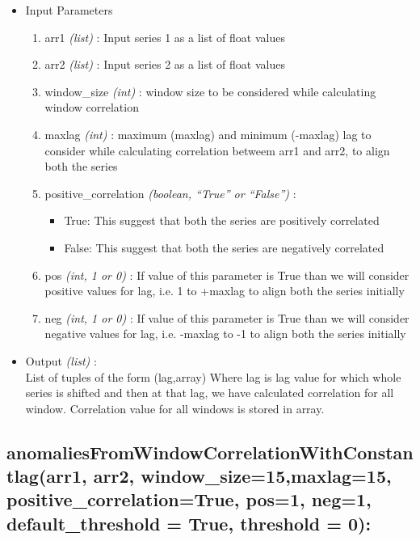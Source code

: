 \begin{itemize}
 \item Input Parameters
 
 \begin{enumerate}
  \item arr1 \textit{(list)} : Input series 1 as a list of float values
  \item arr2 \textit{(list)} : Input series 2 as a list of float values
  \item window\_size \textit{(int)} : window size to be considered while 
calculating window correlation
  \item maxlag \textit{(int)} : maximum (maxlag) and minimum (-maxlag) lag to 
consider while calculating correlation betweem arr1 and arr2, to align both the 
series
  \item positive\_correlation \textit{(boolean, ``True'' or ``False'')} : 
      \begin{itemize}
       \item True: This suggest that both the series are positively correlated
       \item False: This suggest that both the series are negatively correlated
      \end{itemize}
      
  \item pos \textit{(int, 1 or 0)} : If value of this parameter is True than we 
will consider positive values for lag, i.e. 1 to +maxlag to align both the 
series initially
  \item neg \textit{(int, 1 or 0)} : If value of this parameter is True than we 
will consider negative values for lag, i.e. -maxlag to -1 to align both the 
series initially
  
 \end{enumerate}

 \item Output \textit{(list)} : \\
  List of tuples of the form (lag,array)
Where lag is lag value for which whole series is shifted and then at that lag, 
we have calculated correlation for all window. Correlation value for all 
windows is stored in array.
 
\end{itemize}

\subsection{anomaliesFromWindowCorrelationWithConstantlag(arr1, arr2, 
window\_size=15,maxlag=15, positive\_correlation=True, pos=1, neg=1, 
default\_threshold = True, threshold = 0):}


